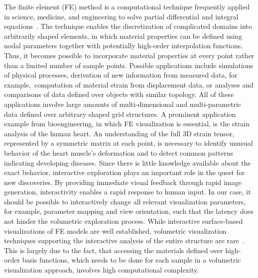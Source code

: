 \documentclass[journal]{vgtc}                %
\begin{document}
The finite element (FE) method is a computational technique frequently applied in science, medicine, and engineering to solve partial differential and integral equations~\cite{Young00}. The technique enables the discretization of complicated domains into arbitrarily shaped elements, in which material properties can be defined using nodal parameters together with potentially high-order interpolation functions. Thus, it becomes possible to incorporate material properties at every point rather than a limited number of sample points. Possible applications include simulations of physical processes, derivation of new information from measured data, for example,~computation of material strain from displacement data, or analyses and comparisons of data defined over objects with similar topology. All of these applications involve large amounts of multi-dimensional and multi-parametric data defined over arbitrary shaped grid structures. A prominent application example from bioengineering, in which FE visualization is essential, is the strain analysis of the human heart. An understanding of the full 3D strain tensor, represented by a symmetric matrix at each point, is necessary to identify unusual behavior of the heart muscle's deformation and to detect common patterns indicating developing diseases. Since there is little knowledge available about the exact behavior, interactive exploration plays an important role in the quest for new discoveries. By providing immediate visual feedback through rapid image generation, interactivity enables a rapid response to human input. In our case, it should be possible to interactively change all relevant visualization parameters, for example, parameter mapping and view orientation, such that the latency does not hinder the volumetric exploration process. While interactive surface-based visualizations of FE models are well established, volumetric visualization techniques supporting the interactive analysis of the entire structure are rare~\cite{Wihelms90}. This is largely due to the fact, that accessing the materials defined over high-order basis functions, which needs to be done for each sample in a volumetric visualization approach, involves high computational complexity.
\end{document}
